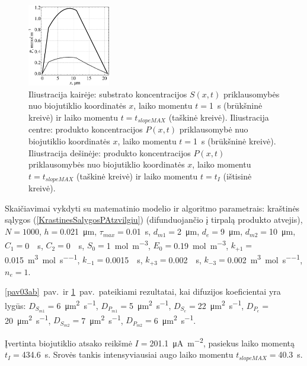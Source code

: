 \documentclass[a4paper,12pt]{article}
\begin{document}
\begin{figure}[ht!]
    \includegraphics[clip=true, width=0.32\textwidth]{figures/fig03e.pdf}
    \caption{Iliustracija kairėje: substrato koncentracijos $S(x,t)$ priklausomybės nuo biojutiklio koordinatės $x$,
    laiko momentu $t ={}$\SI{1}{\second} (brūkšninė kreivė) ir
    laiko momentu $t = t_{slopeMAX}$ (taškinė kreivė).
    Iliustracija centre: produkto koncentracijos $P(x,t)$ priklausomybė nuo biojutiklio koordinatės $x$,
    laiko momentu $t ={}$\SI{1}{\second} (brūkšninė kreivė).
    Iliustracija dešinėje: produkto koncentracijos $P(x,t)$ priklausomybės nuo biojutiklio koordinatės $x$,
    laiko momentu $t = t_{slopeMAX}$ (taškinė kreivė) ir
    laiko momentu $t = t_I$ (ištisinė kreivė).}
    \label{pav03cde}
\end{figure}

Skaičiavimai vykdyti su matematinio modelio ir algoritmo parametrais:
kraštinės sąlygos (\ref{KrastinesSalygosPAtzvilgiu}) (difunduojančio į tirpalą produkto atvejis),
$N = 1000$, $h ={}$\SI{0.021}{\micro\metre}, $\tau_{max} ={}$\SI{0.01}{\second},
$d_{m1} ={}$\SI{2}{\micro\metre}, $d_e ={}$\SI{9}{\micro\metre}, $d_{m2} ={}$\SI{10}{\micro\metre},
$C_1 ={}$\SI{0}{\per\second}, $C_2 ={}$\SI{0}{\per\second}, $S_0 ={}$\SI{1}{\mole\per\metre\cubed}, $E_0 ={}$\SI{0.19}{\mole\per\metre\cubed},
$k_{+1} ={}$\SI{0.015}{\metre\cubed\per\mole\per\second}, $k_{-1} ={}$\SI{0.0015}{\per\second},
$k_{+3} ={}$\SI{0.002}{\per\second}, $k_{-3} ={}$\SI{0.002}{\metre\cubed\per\mole\per\second}, $n_e = 1$.

\ref{pav03ab}~pav.\ ir \ref{pav03cde}~pav.\ pateikiami rezultatai, kai difuzijos koeficientai yra lygūs:
$D_{S_{m1}} ={}$\SI{6}{\micro\metre\squared\per\second}, $D_{P_{m1}} ={}$\SI{5}{\micro\metre\squared\per\second}, $D_{S_e} ={}$\SI{22}{\micro\metre\squared\per\second},
$D_{P_e} ={}$\SI{20}{\micro\metre\squared\per\second}, $D_{S_{m2}} ={}$\SI{7}{\micro\metre\squared\per\second}, $D_{P_{m2}} ={}$\SI{6}{\micro\metre\squared\per\second}.

Įvertinta biojutiklio atsako reikšmė $I ={}$\SI{201.1}{\micro\ampere\per\metre\squared}, pasiekus laiko momentą $t_I ={}$\SI{434.6}{\second}.
Srovės tankis intensyviausiai augo laiko momentu $t_{slopeMAX} ={}$\SI{40.3}{\second}.
\end{document}
